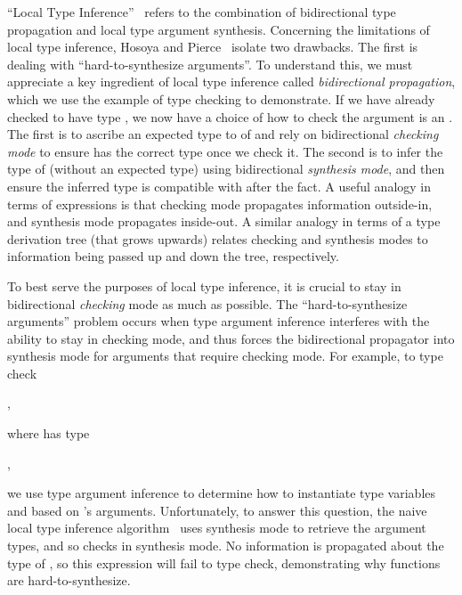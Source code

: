 ``Local Type Inference''~\cite{PierceLTI} refers to the combination of
bidirectional type propagation 
and local type argument synthesis.
%
Concerning the limitations of local type inference,
Hosoya and Pierce~\cite{hosoya1999good}
isolate two drawbacks.
The first is dealing with ``hard-to-synthesize arguments''.
To understand this, we must appreciate a key ingredient of local type inference
called \emph{bidirectional propagation}, which 
we use the example of type checking  to demonstrate.
If we have already checked  to have type , we
now have a choice of how to check the argument  is an .
The first is to ascribe an expected type to  of 
and rely on
bidirectional \emph{checking mode} to ensure  has the correct type
once we check it.
The second is to infer the type of  (without an expected type) using 
bidirectional \emph{synthesis mode}, and then ensure the inferred type
is compatible with  after the fact.
A useful analogy in terms of expressions is that checking mode propagates
information outside-in, and synthesis mode propagates inside-out.
A similar analogy in terms of a type derivation tree (that grows upwards)
relates checking and synthesis modes to information being passed
up and down the tree, respectively.

To best serve the purposes of local type inference, it is crucial to stay in
bidirectional \emph{checking} mode as much as possible.
The ``hard-to-synthesize arguments'' problem occurs when type argument
inference interferes with the ability to stay in checking mode, and
thus forces the bidirectional propagator into synthesis mode
for arguments that require checking mode.
For example, to type check

,

where  has type

,

we use type argument inference to determine how to instantiate type variables 
and  based on 's arguments.
Unfortunately, 
to answer this question,
the naive local type inference algorithm~\cite{PierceLTI}
uses synthesis mode to retrieve the argument types,
and so checks  in synthesis mode.
No information is propagated about the type of ,
so this expression will fail to type check, demonstrating
why functions are hard-to-synthesize.

